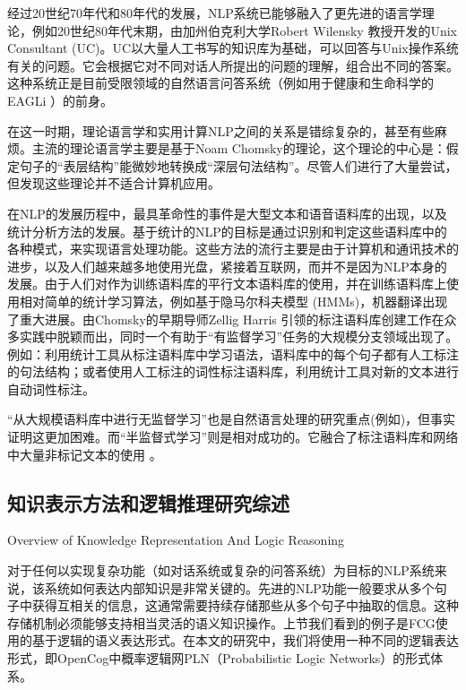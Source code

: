 经过20世纪70年代和80年代的发展，NLP系统已能够融入了更先进的语言学理论，例如20世纪80年代末期，由加州伯克利大学Robert Wilensky 教授开发的Unix Consultant (UC)\cite{Wilensky88theberkeley}。UC以大量人工书写的知识库为基础，可以回答与Unix操作系统有关的问题。它会根据它对不同对话人所提出的问题的理解，组合出不同的答案。这种系统正是目前受限领域的自然语言问答系统（例如用于健康和生命科学的EAGLi \cite{eagli}）的前身。

在这一时期，理论语言学和实用计算NLP之间的关系是错综复杂的，甚至有些麻烦。主流的理论语言学主要是基于Noam Chomsky的理论，这个理论的中心是：假定句子的“表层结构”能微妙地转换成“深层句法结构”。尽管人们进行了大量尝试，但发现这些理论并不适合计算机应用\cite{McCorduck2004}。

在NLP的发展历程中，最具革命性的事件是大型文本和语音语料库的出现，以及统计分析方法的发展。基于统计的NLP的目标是通过识别和判定这些语料库中的各种模式，来实现语言处理功能。这些方法的流行主要是由于计算机和通讯技术的进步，以及人们越来越多地使用光盘，紧接着互联网，而并不是因为NLP本身的发展。由于人们对作为训练语料库的平行文本语料库的使用，并在训练语料库上使用相对简单的统计学习算法，例如基于隐马尔科夫模型 (HMMs)\cite{Hutchins2005}，机器翻译出现了重大进展。由Chomsky的早期导师Zellig Harris \cite{Harris1957}引领的标注语料库创建工作在众多实践中脱颖而出，同时一个有助于“有监督学习”任务的大规模分支领域出现了。例如：利用统计工具从标注语料库中学习语法，语料库中的每个句子都有人工标注的句法结构；或者使用人工标注的词性标注语料库，利用统计工具对新的文本进行自动词性标注。

“从大规模语料库中进行无监督学习”也是自然语言处理的研究重点(例如\cite{Spitkovsky2013})，但事实证明这更加困难。而“半监督式学习”则是相对成功的。它融合了标注语料库和网络中大量非标记文本的使用\cite{Abney2007} \cite{Guo2014}。


\subsection{知识表示方法和逻辑推理研究综述}{Overview of Knowledge Representation And Logic Reasoning}

对于任何以实现复杂功能（如对话系统或复杂的问答系统）为目标的NLP系统来说，该系统如何表达内部知识是非常关键的。先进的NLP功能一般要求从多个句子中获得互相关的信息，这通常需要持续存储那些从多个句子中抽取的信息。这种存储机制必须能够支持相当灵活的语义知识操作。上节我们看到的例子是FCG使用的基于逻辑的语义表达形式。在本文的研究中，我们将使用一种不同的逻辑表达形式，即OpenCog中概率逻辑网PLN（Probabilistic Logic Networks）的形式体系。

